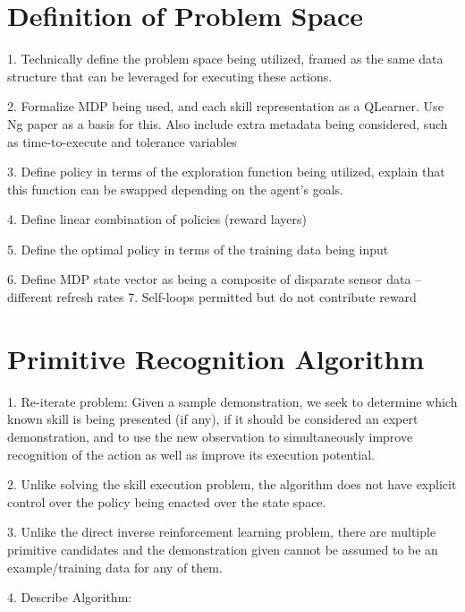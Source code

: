 \documentclass[letterpaper]{article}
\begin{document}
\section{Definition of Problem Space}
\label{sec:pspace}

1. Technically define the problem space being utilized, framed as the same data structure that
   can be leveraged for executing these actions. 

2. Formalize MDP being used, and each skill representation as a QLearner. Use Ng paper as a basis for this. Also include extra metadata
   being considered, such as time-to-execute and tolerance variables

3. Define policy in terms of the exploration function being utilized, explain that this function can be swapped
   depending on the agent's goals.

4. Define linear combination of policies (reward layers)

5. Define the optimal policy in terms of the training data being input

6. Define MDP state vector as being a composite of disparate sensor data -- different refresh rates
7. Self-loops permitted but do not contribute reward


\section{Primitive Recognition Algorithm}
\label{sec:recognition}
1. Re-iterate problem: Given a sample demonstration, we seek to determine which known skill is being presented (if any),
                       if it should be considered an expert demonstration, and to use the new observation to simultaneously
                       improve recognition of the action as well as improve its execution potential.

2. Unlike solving the skill execution problem, the algorithm does not have explicit control over the policy being enacted over the state space.

3. Unlike the direct inverse reinforcement learning problem, there are multiple primitive candidates and the demonstration given cannot be assumed to be an example/training data for any of them.

4. Describe Algorithm:
\end{document}
